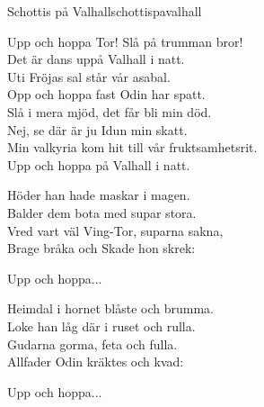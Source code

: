 \begin{song}{Schottis på Valhall}{schottispavalhall}
\begin{vers}
Upp och hoppa Tor! Slå på trumman bror!\\
Det är dans uppå Valhall i natt.\\
Uti Fröjas sal står vår asabal.\\
Opp och hoppa fast Odin har spatt.\\
Slå i mera mjöd, det får bli min död.\\
Nej, se där är ju Idun min skatt.\\
Min valkyria kom hit till vår fruktsamhetsrit.\\
Upp och hoppa på Valhall i natt.\\
\end{vers}
\begin{vers}
Höder han hade maskar i magen.\\
Balder dem bota med supar stora.\\
Vred vart väl Ving-Tor, suparna sakna,\\
Brage bråka och Skade hon skrek:\\
\end{vers}
\begin{vers}
Upp och hoppa...\\
\end{vers}
\begin{vers}
Heimdal i hornet blåste och brumma.\\
Loke han låg där i ruset och rulla.\\
Gudarna gorma, feta och fulla.\\
Allfader Odin kräktes och kvad:\\
\end{vers}
\begin{vers}
Upp och hoppa...\\
\end{vers}
\end{song}
